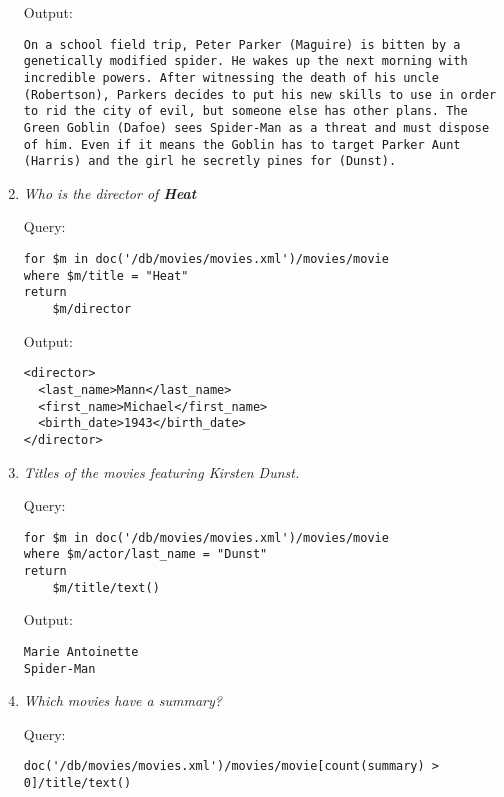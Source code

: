 \documentclass[a4paper, notitlepage]{article}
\begin{document}
\begin{enumerate}
Output:
  
\begin{lstlisting}
On a school field trip, Peter Parker (Maguire) is bitten by a genetically modified spider. He wakes up the next morning with incredible powers. After witnessing the death of his uncle (Robertson), Parkers decides to put his new skills to use in order to rid the city of evil, but someone else has other plans. The Green Goblin (Dafoe) sees Spider-Man as a threat and must dispose of him. Even if it means the Goblin has to target Parker Aunt (Harris) and the girl he secretly pines for (Dunst).
\end{lstlisting}  

\item 
  \emph{Who is the director of \textbf{Heat}} 
  
Query: 
  
\begin{lstlisting}
for $m in doc('/db/movies/movies.xml')/movies/movie
where $m/title = "Heat"
return
    $m/director
\end{lstlisting}
  
Output:
  
\begin{lstlisting}
<director>
  <last_name>Mann</last_name>
  <first_name>Michael</first_name>
  <birth_date>1943</birth_date>
</director>
\end{lstlisting}  
  
\item 
  \emph{Titles of the movies featuring Kirsten Dunst.} 
  
Query: 
  
\begin{lstlisting}
for $m in doc('/db/movies/movies.xml')/movies/movie
where $m/actor/last_name = "Dunst"
return
    $m/title/text()
\end{lstlisting}
  
Output:
  
\begin{lstlisting}
Marie Antoinette
Spider-Man
\end{lstlisting}   

\item 
  \emph{  Which movies have a summary?} 
  
Query: 
  
\begin{lstlisting}
doc('/db/movies/movies.xml')/movies/movie[count(summary) > 0]/title/text()
\end{lstlisting}
  

\end{enumerate}
\end{document}
